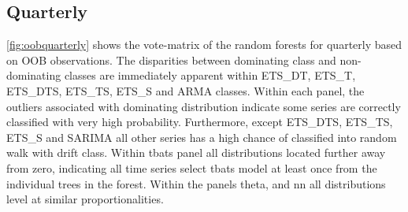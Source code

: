 \documentclass[11pt,a4paper,]{article}
\begin{document}
\subsection{Quarterly}\label{quarterly}

\autoref{fig:oobquarterly} shows the vote-matrix of the random forests
for quarterly based on OOB observations. The disparities between
dominating class and non-dominating classes are immediately apparent
within ETS\_DT, ETS\_T, ETS\_DTS, ETS\_TS, ETS\_S and ARMA classes.
Within each panel, the outliers associated with dominating distribution
indicate some series are correctly classified with very high
probability. Furthermore, except ETS\_DTS, ETS\_TS, ETS\_S and SARIMA
all other series has a high chance of classified into random walk with
drift class. Within tbats panel all distributions located further away
from zero, indicating all time series select tbats model at least once
from the individual trees in the forest. Within the panels theta, and nn
all distributions level at similar proportionalities.
\end{document}
